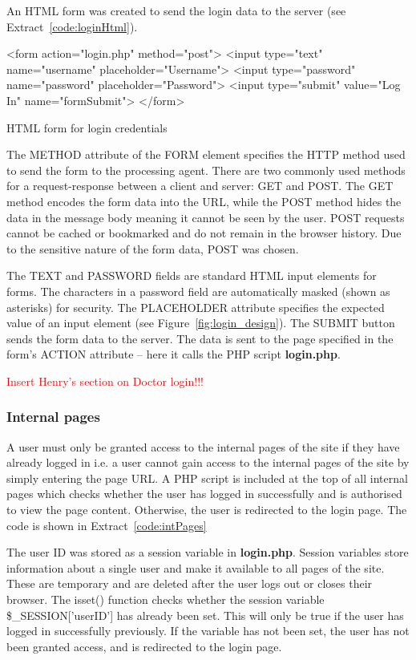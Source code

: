 \documentclass[11pt]{article}
\begin{document}
An HTML form was created to send the login data to the server (see Extract~\ref{code:loginHtml}).

\begin{code}[ht]
\begin{html}
<form action="login.php" method="post">
	<input type="text" name="username" placeholder="Username">
	<input type="password" name="password" placeholder="Password"> 
	<input type="submit" value="Log In" name="formSubmit">  
</form>
\end{html}
\caption{HTML form for login credentials}
\label{code:loginHtml}
\end{code}


The METHOD attribute of the FORM element specifies the HTTP method used to send the form to the processing agent. There are two commonly used methods for a request-response between a client and server: GET and POST. The GET method encodes the form data into the URL, while the POST method hides the data in the message body meaning it cannot be seen by the user. POST requests cannot be cached or bookmarked and do not remain in the browser history. Due to the sensitive nature of the form data, POST was chosen.

The TEXT and PASSWORD fields are standard HTML input elements for forms. The characters in a password field are automatically masked (shown as asterisks) for security. The PLACEHOLDER attribute specifies the expected value of an input element (see Figure~\ref{fig:login_design}). The SUBMIT button sends the form data to the server. The data is sent to the page specified in the form's ACTION attribute – here it calls the PHP script \textbf{login.php}.

\textcolor{red}{Insert Henry's section on Doctor login!!!}

\subsubsection{Internal pages}

A user must only be granted access to the internal pages of the site if they have already logged in i.e. a user cannot gain access to the internal pages of the site by simply entering the page URL. A PHP script is included at the top of all internal pages which checks whether the user has logged in successfully and is authorised to view the page content. Otherwise, the user is redirected to the login page. The code is shown in Extract~\ref{code:intPages}

The user ID was stored as a session variable in \textbf{login.php}. Session variables store information about a single user and make it available to all pages of the site. These are temporary and are deleted after the user logs out or closes their browser. The isset() function checks whether the session variable \mbox{\$\_SESSION['userID']} has already been set. This will only be true if the user has logged in successfully previously. If the variable has not been set, the user has not been granted access, and is redirected to the login page.
\end{document}
